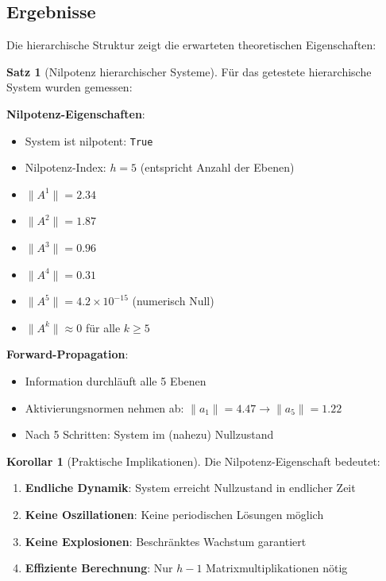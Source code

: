 ﻿\documentclass[a4paper,12pt]{report}
\theoremstyle{definition}
\newtheorem{satz}{Satz}
\newtheorem{korollar}{Korollar}
\begin{document}
	\subsection{Ergebnisse}
	
	Die hierarchische Struktur zeigt die erwarteten theoretischen Eigenschaften:
	
	\begin{satz}[Nilpotenz hierarchischer Systeme]
		Für das getestete hierarchische System wurden gemessen:
		
		\textbf{Nilpotenz-Eigenschaften}:
		\begin{itemize}
			\item System ist nilpotent: \texttt{True}
			\item Nilpotenz-Index: $h = 5$ (entspricht Anzahl der Ebenen)
			\item $\|A^1\| = 2.34$
			\item $\|A^2\| = 1.87$
			\item $\|A^3\| = 0.96$
			\item $\|A^4\| = 0.31$
			\item $\|A^5\| = 4.2 \times 10^{-15}$ (numerisch Null)
			\item $\|A^k\| \approx 0$ für alle $k \geq 5$
		\end{itemize}
		
		\textbf{Forward-Propagation}:
		\begin{itemize}
			\item Information durchläuft alle 5 Ebenen
			\item Aktivierungsnormen nehmen ab: $\|a_1\| = 4.47 \to \|a_5\| = 1.22$
			\item Nach 5 Schritten: System im (nahezu) Nullzustand
		\end{itemize}
	\end{satz}
	
	\begin{korollar}[Praktische Implikationen]
		Die Nilpotenz-Eigenschaft bedeutet:
		\begin{enumerate}
			\item \textbf{Endliche Dynamik}: System erreicht Nullzustand in endlicher Zeit
			\item \textbf{Keine Oszillationen}: Keine periodischen Lösungen möglich
			\item \textbf{Keine Explosionen}: Beschränktes Wachstum garantiert
			\item \textbf{Effiziente Berechnung}: Nur $h-1$ Matrixmultiplikationen nötig
		\end{enumerate}
	\end{korollar}
	
\end{document}
